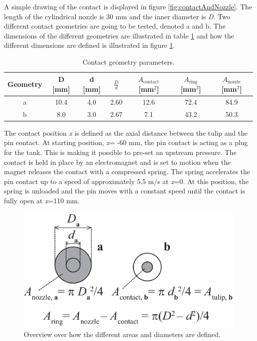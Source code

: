 \documentclass[10pt,a4paper,twoside]{article}
\begin{document}
A simple drawing of the contact is displayed in figure \ref{fig:contactAndNozzle}. The length of the cylindrical nozzle is 30 mm and the inner diameter is \textit{D}. Two different contact geometries are going to be tested, denoted a and b. The dimensions of the different geometries are illustrated in table \ref{tab:contGeoPara} and how the different dimensions are defined is illustrated in figure \ref{fig:AreacontactAndNozzle}.

\begin{table}[H]
\center
\caption{Contact geometry parameters.}
 \begin{tabular}{|c|c|c|c|c|c|c|}
\hline 
Geometry & D [mm] & d [mm] & $\frac{D}{d}$ & $A_\mathrm{{contact}}$ [mm$^2$] & $A_\mathrm{{ring}}$ [mm$^2$] & $A_\mathrm{{nozzle}}$ [mm$^2$] \\ 
\hline 
a & 10.4 & 4.0 & 2.60 & 12.6 & 72.4 & 84.9 \\ 
\hline 
b & 8.0 & 3.0 & 2.67 & 7.1 & 43.2 & 50.3 \\ 
\hline 
\end{tabular} 
\label{tab:contGeoPara}
\end{table}

The contact position \textit{x} is defined as the axial distance between the tulip and the pin contact. At starting position, \textit{x}= -60 mm, the pin contact is acting as a plug for the tank. This is making it possible to pre-set an upstream pressure. The contact is held in place by an electromagnet and is set to motion when the magnet releases the contact with a compressed spring. The spring accelerates the pin contact up to a speed of approximately 5.5 m/s at \textit{x}=0. At this position, the spring is unloaded and the pin moves with a constant speed until the contact is fully open at \textit{x}=110 mm.

\begin{figure} [H]
\centering
\includegraphics[scale=0.2]{Bilder/Theory/kontaktoversiktAnders.png}
\caption{Overview over how the different areas and diameters are defined.} \label{fig:AreacontactAndNozzle}
\end{figure}
\end{document}
